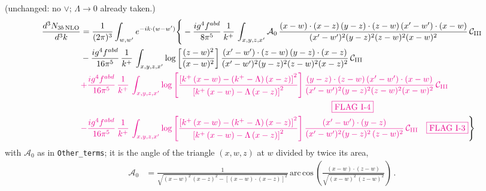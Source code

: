 \documentclass[9pt]{article}
\numberwithin{equation}{section}
\begin{document}
(unchanged: no $\vee$; $\Lambda\to0$ already taken.)
\begin{align}
\frac{d^{3}N_{3b\,\rm NLO}}{d^{3}k} & = \frac{1}{(2\pi)^{3}}\int_{w,w'}e^{-ik\cdot(w-w')}\Bigg\{
-\frac{ig^{4}f^{abd}}{8\pi^{5}}\,\frac{1}{k^{+}}\,\int_{x,y,z,x'}\mathcal{A}_{0}\,
\frac{(x-w)\cdot(x-z)\,(y-z)\cdot(z-w)\,(x'-w')\cdot(x-w)}{(x'-w')^{2}(y-z)^{2}(z-w)^{2}(x-w)^{2}}\,\mathcal{C}_{\rm III}\notag \\
& -\frac{ig^{4}f^{abd}}{16\pi^{5}}\,\frac{1}{k^{+}}\,\int_{x,y,z,x'}\log{\left[\frac{(z-w)^{2}}{(x-w)^{2}}\right]}\,
\frac{(x'-w')\cdot(z-w)\,(y-z)\cdot(x-z)}{(x'-w')^{2}(y-z)^{2}(z-w)^{2}(x-z)^{2}}\,\mathcal{C}_{\rm III}\notag \\
&{\color{magenta}+ \frac{ig^{4}f^{abd}}{16\pi^{5}}\,\frac{1}{k^{+}}\,\int_{x,y,z,x'}\log{\left[\frac{\left[k^{+}\,(x-w)-(k^{+}-\Lambda)\,(x-z)\right]^{2}}{\left[k^{+}\,(x-w)-\Lambda\,(x-z)\right]^{2}}\right]}\,
\frac{(y-z)\cdot(z-w)\,(x'-w')\cdot(x-w)}{(x'-w')^{2}(y-z)^{2}(z-w)^{2}(x-w)^{2}}\,\mathcal{C}_{\rm III}}\notag \\
&\hspace{30em}{\color{magenta}\fbox{FLAG I-4}}\notag \\
& {\color{magenta}-\frac{ig^{4}f^{abd}}{16\pi^{5}}\,\frac{1}{k^{+}}\,\int_{x,y,z,x'}\log{\left[\frac{\left[k^{+}\,(x-w)-(k^{+}-\Lambda)\,(x-z)\right]^{2}}{\left[k^{+}\,(x-w)-\Lambda\,(x-z)\right]^{2}}\right]}\,\frac{(x'-w')\cdot(y-z)}{(x'-w')^{2}(y-z)^{2}\,(z-w)^{2}}\,\mathcal{C}_{\rm III}\quad\fbox{FLAG I-3}}\Bigg\}
\end{align}
with $\mathcal{A}_{0}$ as in \texttt{Other\_terms}; it is the angle of the triangle $(x,w,z)$ at $w$ divided by twice its area,
\begin{align}
\mathcal{A}_{0} & = \frac{1}{\sqrt{(x-w)^{2}\,(x-z)^{2}-\left[(x-w)\cdot (x-z)\right]^{2}}}\,\mathrm{arc\,cos}\,\left(\frac{(x-w)\cdot (z-w)}{\sqrt{(x-w)^{2}\,(z-w)^{2}}}\right)\,.
\end{align}
\end{document}

